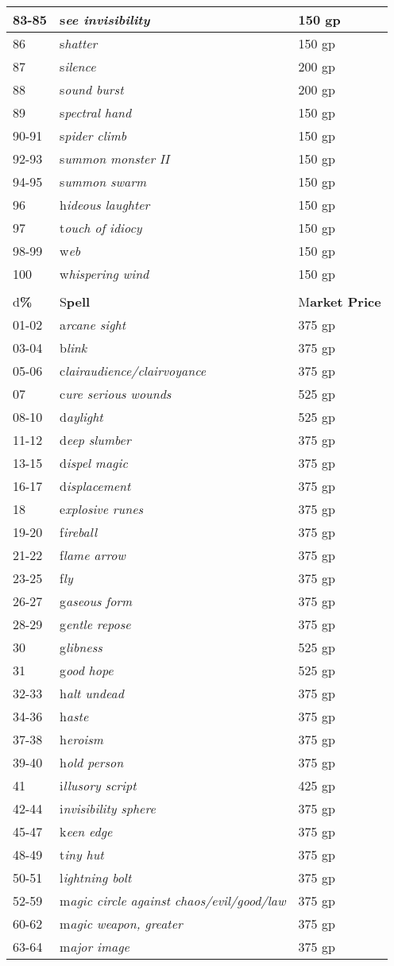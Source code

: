 \documentclass{article}
\begin{document}
\begin{tabular}{|>{\raggedright}p{28pt}|>{\raggedright}p{200pt}|>{\raggedright}p{85pt}|}
\hline
83-85 & s\textit{ee invisibility} & 150 gp\tabularnewline
\hline
86 & s\textit{hatter} & 150 gp\tabularnewline
\hline
87 & s\textit{ilence} & 200 gp\tabularnewline
\hline
88 & s\textit{ound burst} & 200 gp\tabularnewline
\hline
89 & s\textit{pectral hand} & 150 gp\tabularnewline
\hline
90-91 & s\textit{pider climb} & 150 gp\tabularnewline
\hline
92-93 & s\textit{ummon monster II} & 150 gp\tabularnewline
\hline
94-95 & s\textit{ummon swarm} & 150 gp\tabularnewline
\hline
96 & h\textit{ideous laughter} & 150 gp\tabularnewline
\hline
97 & t\textit{ouch of idiocy} & 150 gp\tabularnewline
\hline
98-99 & w\textit{eb} & 150 gp\tabularnewline
\hline
100 & w\textit{hispering wind} & 150 gp\tabularnewline
\hline
\multicolumn{3}{|p{314pt}|}{3\textit{\textbf{rd-Level Arcane Spells}}}\tabularnewline
\hline
d\textbf{\%} & S\textbf{pell} & M\textbf{arket Price}\tabularnewline
\hline
01-02 & a\textit{rcane sight} & 375 gp\tabularnewline
\hline
03-04 & b\textit{link} & 375 gp\tabularnewline
\hline
05-06 & c\textit{lairaudience/clairvoyance} & 375 gp\tabularnewline
\hline
07 & c\textit{ure serious wounds} & 525 gp\tabularnewline
\hline
08-10 & d\textit{aylight} & 525 gp\tabularnewline
\hline
11-12 & d\textit{eep slumber} & 375 gp\tabularnewline
\hline
13-15 & d\textit{ispel magic} & 375 gp\tabularnewline
\hline
16-17 & d\textit{isplacement} & 375 gp\tabularnewline
\hline
18 & e\textit{xplosive runes} & 375 gp\tabularnewline
\hline
19-20 & f\textit{ireball} & 375 gp\tabularnewline
\hline
21-22 & f\textit{lame arrow} & 375 gp\tabularnewline
\hline
23-25 & f\textit{ly} & 375 gp\tabularnewline
\hline
26-27 & g\textit{aseous form} & 375 gp\tabularnewline
\hline
28-29 & g\textit{entle repose} & 375 gp\tabularnewline
\hline
30 & g\textit{libness} & 525 gp\tabularnewline
\hline
31 & g\textit{ood hope} & 525 gp\tabularnewline
\hline
32-33 & h\textit{alt undead} & 375 gp\tabularnewline
\hline
34-36 & h\textit{aste} & 375 gp\tabularnewline
\hline
37-38 & h\textit{eroism} & 375 gp\tabularnewline
\hline
39-40 & h\textit{old person} & 375 gp\tabularnewline
\hline
41 & i\textit{llusory script} & 425 gp\tabularnewline
\hline
42-44 & i\textit{nvisibility sphere} & 375 gp\tabularnewline
\hline
45-47 & k\textit{een edge} & 375 gp\tabularnewline
\hline
48-49 & t\textit{iny hut} & 375 gp\tabularnewline
\hline
50-51 & l\textit{ightning bolt} & 375 gp\tabularnewline
\hline
52-59 & m\textit{agic circle against chaos/evil/good/law} & 375 gp\tabularnewline
\hline
60-62 & m\textit{agic weapon, greater} & 375 gp\tabularnewline
\hline
63-64 & m\textit{ajor image} & 375 gp\tabularnewline
\hline

\end{tabular}
\end{document}

